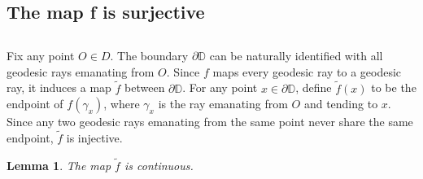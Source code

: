 \documentclass{amsart}
\theoremstyle{plain}
\newtheorem{Lemma}{Lemma}[section]
\theoremstyle{definition}
\theoremstyle{remark}
\begin{document}
\subsection{The map f is surjective}
\subsection*{} %
Fix any point $O\in D$.  The boundary $\partial \mathbb{D}$ can be naturally identified with all geodesic rays emanating from $O$.  Since $f$ maps every geodesic ray to a geodesic ray, it induces a map $\tilde{f}$ between $\partial \mathbb{D}$.  For any point $x \in \partial \mathbb{D}$, define $\tilde{f}(x)$ to be the endpoint of $f(\gamma_x)$, where $\gamma_x$ is the ray emanating from $O$ and tending to $x$.  Since any two geodesic rays emanating from the same point never share the same endpoint, $\tilde{f}$ is injective.  
% 
% 
\begin{Lemma}
    The map $\tilde{f}$ is continuous.  
\end{Lemma}
\end{document}
